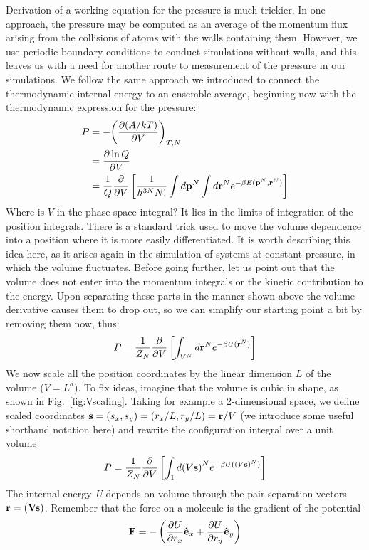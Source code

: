 \documentclass[]{article}
\begin{document}
Derivation of a working equation for the pressure is much trickier.
In one approach, the pressure may be computed as an average of the momentum
flux arising from the collisions of atoms with the walls
containing them. However, we use periodic boundary
conditions to conduct simulations without walls, and this leaves us with
a need for another route to measurement of the pressure in our
simulations. We follow the same approach we introduced to connect the
thermodynamic internal energy to an ensemble average, beginning now with
the thermodynamic expression for the pressure:
\begin{align*}
P &=  - {\left( {\frac{{\partial (A/kT)}}{{\partial V}}} \right)_{T,N}}\\
 &= \frac{{\partial \ln Q}}{{\partial V}}\\
 &= \frac{1}{Q}\frac{\partial }{{\partial V}}\left[ {\frac{1}{{{h^{3N}}N!}}\int {d{{\bf{p}}^N}\int {d{{\bf{r}}^N}} {e^{ - \beta E({{\bf{p}}^N},{{\bf{r}}^N})}}} } \right]
\end{align*}
Where is $V$ in the phase-space integral? It lies in the limits of
integration of the position integrals. There is a standard trick used to
move the volume dependence into a position where it is more easily
differentiated. It is worth describing this idea here, as it arises
again in the simulation of systems at constant pressure, in which the
volume fluctuates. Before going further, let us point out that the
volume does not enter into the momentum integrals or the kinetic
contribution to the energy. Upon separating these parts in the manner
shown above the volume derivative causes them to drop out, so we can
simplify our starting point a bit by removing them now, thus:
\[P = \frac{1}{{{Z_N}}}\frac{\partial }{{\partial V}}\left[ {\int_{{V^N}} {d{{\bf{r}}^N}{e^{ - \beta U({{\bf{r}}^N})}}} } \right]\]
We now scale all the position coordinates by the linear dimension
$L$ of the volume ($V = L^d$). To fix ideas,
imagine that the volume is cubic in shape, as shown in Fig.~\ref{fig:Vscaling}.
Taking for example a 2-dimensional space, we define scaled coordinates ${\bf{s}} = ({s_x},{s_y}) = ({r_x}/L,{r_y}/L) = {\bf{r}}/V$
(we introduce some useful shorthand notation here) and rewrite the
configuration integral over a unit volume
\[P = \frac{1}{{{Z_N}}}\frac{\partial }{{\partial V}}\left[ {\int_1 {d{{(V{\bf{s}})}^N}{e^{ - \beta U({{(V{\bf{s}})}^N})}}} } \right]\]
The internal energy \emph{U} depends on volume through the pair
separation vectors $\bf{r} = (V\bf{s})$. Remember that the force
on a molecule is the gradient of the potential
\[{\bf{F}} =  - \left( {\frac{{\partial U}}{{\partial {r_x}}}{{{\bf{\hat e}}}_x} + \frac{{\partial U}}{{\partial {r_y}}}{{{\bf{\hat e}}}_y}} \right)\]
\end{document}
